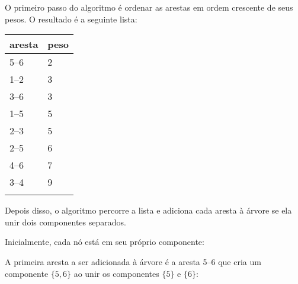 \begin{samepage}
O primeiro passo do algoritmo é ordenar as
arestas em ordem crescente de seus pesos.
O resultado é a seguinte lista:

\begin{tabular}{ll}
\\
aresta & peso \\
\hline
5--6 & 2 \\
1--2 & 3 \\
3--6 & 3 \\
1--5 & 5 \\
2--3 & 5 \\
2--5 & 6 \\
4--6 & 7 \\
3--4 & 9 \\
\\
\end{tabular}
\end{samepage}

Depois disso, o algoritmo percorre a lista
e adiciona cada aresta à árvore se ela unir
dois componentes separados.

Inicialmente, cada nó está em seu próprio componente:

\begin{center}
\end{center}
A primeira aresta a ser adicionada à árvore é
a aresta 5--6 que cria um componente $\{5,6\}$
ao unir os componentes $\{5\}$ e $\{6\}$:

